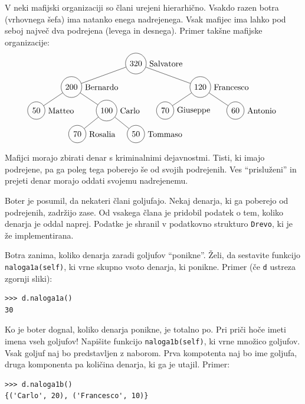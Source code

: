 \documentclass[arhiv]{izpit}
\begin{document}

V neki mafijski organizaciji so člani urejeni hierarhično. Vsakdo razen botra (vrhovnega šefa) ima natanko enega
nadrejenega. Vsak mafijec ima lahko pod seboj največ dva podrejena (levega in desnega). Primer takšne mafijske
organizacije:
$$
\begin{tikzpicture}[level distance=1cm,
    level 1/.style={sibling distance=5.5cm},
    level 2/.style={sibling distance=3cm},
    level 3/.style={sibling distance=2.5cm}
    ]
    \node[circle, draw, label=0:Salvatore] (d) {320}
      child {node[circle, draw, label=0:Bernardo] {200}
        child {node[circle, draw, label=0:Matteo] {50}}
        child {node[circle, draw, label=0:Carlo] {100}
          child {node[circle, draw, label=0:Rosalia] {70}}
          child {node[circle, draw, label=0:Tommaso] {50}}
        }
      }
      child {node[circle, draw, label=0:Francesco] {120}
        child {node[circle, draw, label=0:Giuseppe] {70}}
        child {node[circle, draw, label=0:Antonio] {60}}
      };
  \end{tikzpicture}
$$
Mafijci morajo zbirati denar s kriminalnimi dejavnostmi. Tisti, ki imajo podrejene, pa ga poleg tega poberejo
še od svojih podrejenih. Ves ``prisluženi'' in prejeti denar morajo oddati svojemu nadrejenemu.

Boter je posumil, da nekateri člani goljufajo. Nekaj denarja, ki ga poberejo od podrejenih, zadržijo zase. Od vsakega
člana je pridobil podatek o tem, koliko denarja je oddal naprej. Podatke je shranil v podatkovno strukturo \texttt{Drevo}, ki je že implementirana.

\podnaloga[10 točk]
Botra zanima, koliko denarja zaradi goljufov ``ponikne''. Želi, da sestavite funkcijo \texttt{naloga1a(self)}, ki vrne skupno vsoto denarja, ki ponikne. Primer (če \texttt{d} ustreza zgornji sliki):
%
\begin{verbatim}
>>> d.naloga1a()
30
\end{verbatim}

\podnaloga[10 točk]
Ko je boter dognal, koliko denarja ponikne, je totalno po. Pri priči hoče imeti imena vseh goljufov!
Napišite funkcijo \texttt{naloga1b(self)}, ki vrne množico goljufov. Vsak goljuf naj bo predstavljen z naborom. Prva kompotenta naj bo ime goljufa, druga komponenta pa količina denarja, ki ga je utajil. Primer:
%
\begin{verbatim}
>>> d.naloga1b()
{('Carlo', 20), ('Francesco', 10)}
\end{verbatim}
\end{document}
